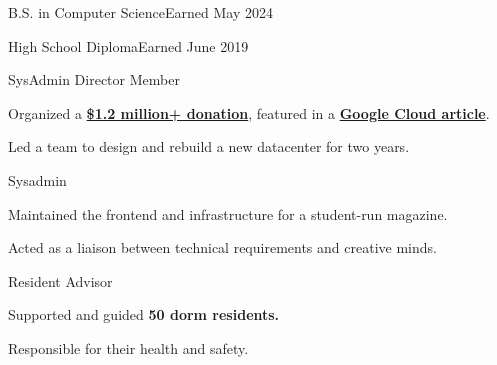 \vspace{1.5pt} %

{
	{B.S. in Computer Science}{Earned May 2024}
	{}
	{}
}

{
	{High School Diploma}{Earned June 2019}
	{}{}
}


\medskip


\medskip


{
	{SysAdmin Director}    \hfill{}\newline
	{Member}    \hfill{}\newline
}
{
	\item{Organized a \href{https://www.rit.edu/news/wayfair-gifts-850000-servers-rits-computer-science-house}{\textbf{\$1.2 million+ donation}},} featured in a \href{https://cloud.google.com/blog/transform/wayfair-server-donation-mass-open-cloud-rit-student-innovation-johonnot}{\textbf{Google Cloud article}}.
	\item{Led a team to design and rebuild a new datacenter for two years.}
}

{
	{Sysadmin} \hfill{}\newline
}
{
	\item{Maintained the frontend and infrastructure for a student-run magazine.}
	\item{Acted as a liaison between technical requirements and creative minds.}
}

{
	{Resident Advisor} \hfill{}\newline
}
{
	\item{Supported and guided \textbf{50 dorm residents.}}
	\item{Responsible for their health and safety.}
}

